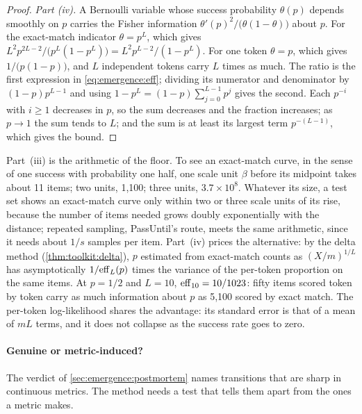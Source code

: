 \begin{refsection}
\begin{proof}
\emph{Part (iv).} A Bernoulli variable whose success probability $\theta(p)$ depends smoothly on $p$ carries the Fisher information $\theta'(p)^2/\bigl(\theta(1-\theta)\bigr)$ about $p$. For the exact-match indicator $\theta=p^L$, which gives $L^2p^{2L-2}/\bigl(p^L(1-p^L)\bigr)=L^2p^{L-2}/(1-p^L)$. For one token $\theta=p$, which gives $1/\bigl(p(1-p)\bigr)$, and $L$ independent tokens carry $L$ times as much. The ratio is the first expression in \eqref{eq:emergence:eff}; dividing its numerator and denominator by $(1-p)p^{L-1}$ and using $1-p^L=(1-p)\sum_{j=0}^{L-1}p^j$ gives the second. Each $p^{-i}$ with $i\ge1$ decreases in $p$, so the sum decreases and the fraction increases; as $p\to1$ the sum tends to $L$; and the sum is at least its largest term $p^{-(L-1)}$, which gives the bound.
\end{proof}

Part~(iii) is the arithmetic of the floor. To see an exact-match curve, in the sense of one success with probability one half, one scale unit $\beta$ before its midpoint takes about 11 items; two units, 1,100; three units, $3.7\times10^8$. Whatever its size, a test set shows an exact-match curve only within two or three scale units of its rise, because the number of items needed grows doubly exponentially with the distance; repeated sampling, PassUntil's route, meets the same arithmetic, since it needs about $1/s$ samples per item. Part~(iv) prices the alternative: by the delta method (\cref{thm:toolkit:delta}), $p$ estimated from exact-match counts as $(X/m)^{1/L}$ has asymptotically $1/\mathrm{eff}_L(p)$ times the variance of the per-token proportion on the same items. At $p=1/2$ and $L=10$, $\mathrm{eff}_{10}=10/1023$: fifty items scored token by token carry as much information about $p$ as 5,100 scored by exact match. The per-token log-likelihood shares the advantage: its standard error is that of a mean of $mL$ terms, and it does not collapse as the success rate goes to zero.

\paragraph{Genuine or metric-induced?} The verdict of \cref{sec:emergence:postmortem} names transitions that are sharp in continuous metrics. The method needs a test that tells them apart from the ones a metric makes.


\end{refsection}
